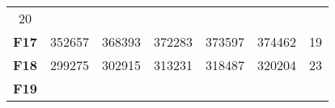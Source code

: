 \documentclass[12pt,a4paper]{article}
\begin{document}
\begin{longtable}[c]{@{}crrrrrr@{}}
\begin{minipage}[t]{0.07\columnwidth}
20
\strut\end{minipage}\tabularnewline
\begin{minipage}[t]{0.11\columnwidth}\centering\strut
\textbf{F17}
\strut\end{minipage} &
\begin{minipage}[t]{0.08\columnwidth}\raggedleft\strut
352657
\strut\end{minipage} &
\begin{minipage}[t]{0.08\columnwidth}\raggedleft\strut
368393
\strut\end{minipage} &
\begin{minipage}[t]{0.09\columnwidth}\raggedleft\strut
372283
\strut\end{minipage} &
\begin{minipage}[t]{0.10\columnwidth}\raggedleft\strut
373597
\strut\end{minipage} &
\begin{minipage}[t]{0.11\columnwidth}\raggedleft\strut
374462
\strut\end{minipage} &
\begin{minipage}[t]{0.07\columnwidth}\raggedleft\strut
19
\strut\end{minipage}\tabularnewline
\begin{minipage}[t]{0.11\columnwidth}\centering\strut
\textbf{F18}
\strut\end{minipage} &
\begin{minipage}[t]{0.08\columnwidth}\raggedleft\strut
299275
\strut\end{minipage} &
\begin{minipage}[t]{0.08\columnwidth}\raggedleft\strut
302915
\strut\end{minipage} &
\begin{minipage}[t]{0.09\columnwidth}\raggedleft\strut
313231
\strut\end{minipage} &
\begin{minipage}[t]{0.10\columnwidth}\raggedleft\strut
318487
\strut\end{minipage} &
\begin{minipage}[t]{0.11\columnwidth}\raggedleft\strut
320204
\strut\end{minipage} &
\begin{minipage}[t]{0.07\columnwidth}\raggedleft\strut
23
\strut\end{minipage}\tabularnewline
\begin{minipage}[t]{0.11\columnwidth}\centering\strut
\textbf{F19}
\strut\end{minipage} &
\begin{minipage}[t]{0.08\columnwidth}\raggedleft\strut

\end{minipage}
\end{longtable}
\end{document}
